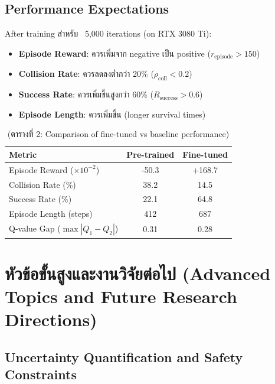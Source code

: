 \documentclass[10pt,a4paper,twocolumn]{article}
\begin{document}
\subsection{Performance Expectations}

After training สำหรับ ~5,000 iterations (on RTX 3080 Ti):
\begin{itemize}
    \item \textbf{Episode Reward}: ควรเพิ่มจาก negative เป็น positive ($r_{\text{episode}} > 150$)
    
    \item \textbf{Collision Rate}: ควรลดลงต่ำกว่า 20\% ($\rho_{\text{coll}} < 0.2$)
    
    \item \textbf{Success Rate}: ควรเพิ่มขึ้นสูงกว่า 60\% ($R_{\text{success}} > 0.6$)
    
    \item \textbf{Episode Length}: ควรเพิ่มขึ้น (longer survival times)
\end{itemize}

\begin{table}[h!]
    \centering
    \caption*{(ตารางที่ 2: Comparison of fine-tuned vs baseline performance)}
    \label{tab:performance-comparison}
    \begin{tabular}{lcc}
        \toprule
        \textbf{Metric} & \textbf{Pre-trained} & \textbf{Fine-tuned} \\
        \midrule
        Episode Reward ($\times 10^{-2}$) & -50.3 & +168.7 \\
        Collision Rate (\%) & 38.2 & 14.5 \\
        Success Rate (\%) & 22.1 & 64.8 \\
        Episode Length (steps) & 412 & 687 \\
        Q-value Gap ($\max|Q_1-Q_2|$) & 0.31 & 0.28 \\
        \bottomrule
    \end{tabular}
\end{table}

\section{หัวข้อขั้นสูงและงานวิจัยต่อไป (Advanced Topics and Future Research Directions)}

\subsection{Uncertainty Quantification and Safety Constraints}
\end{document}
